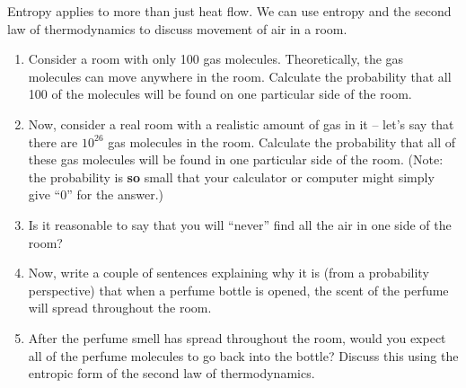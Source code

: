\begin{exercise}
Entropy applies to more than just heat flow.  We can use entropy
and the second law of thermodynamics to discuss movement of
air in a room.
\begin{enumerate}
\item Consider a room with only 100 gas molecules.  Theoretically,
the gas molecules can move anywhere in the room.  Calculate the 
probability that all 100 of the molecules will be found on
one particular side of the room.
\item Now, consider a real room with a realistic amount of gas in
it -- let's say that there are $10^{26}$ gas molecules in the room.
Calculate the probability that all of these gas molecules will
be found in one particular side of the room.  (Note:  the probability
is \textbf{so} small that your calculator or computer might simply
give ``0'' for the answer.)
\item Is it reasonable to say that you will ``never'' find all the
air in one side of the room?
\item Now, write a couple of sentences explaining why it is
(from a probability perspective) that when a perfume bottle is
opened, the scent of the perfume will spread throughout
the room.  
\item After the perfume smell has spread throughout the room,
would you expect all of the perfume molecules to go back
into the bottle?  Discuss this using the entropic form of the
second law of thermodynamics.
\end{enumerate}
\end{exercise}


